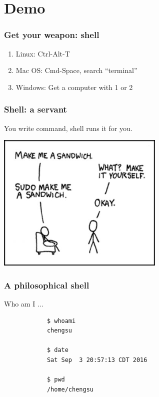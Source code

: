 \documentclass{beamer}
\begin{document}
	\section{Demo}

	\begin{frame}
		\frametitle{Get your weapon: shell}
		\begin{enumerate}
			\item Linux: Ctrl-Alt-T
			\item Mac OS: Cmd-Space, search ``terminal''
			\item Windows: Get a computer with 1 or 2
		\end{enumerate}
	\end{frame}

	\begin{frame}
		\frametitle{Shell: a servant}
		You write command, shell runs it for you.
		\begin{center}
		\includegraphics[width=0.6\textwidth, height=0.6\textheight]{img/sudo.jpg}
		\end{center}
	\end{frame}

	\begin{frame}[fragile]
		\frametitle{A philosophical shell}
		Who am I ...
		\begin{center}
		\begin{verbatim}
			$ whoami
			chengsu

			$ date
			Sat Sep  3 20:57:13 CDT 2016

			$ pwd
			/home/chengsu 
		\end{verbatim}
		\end{center}	
	\end{frame}
\end{document}
